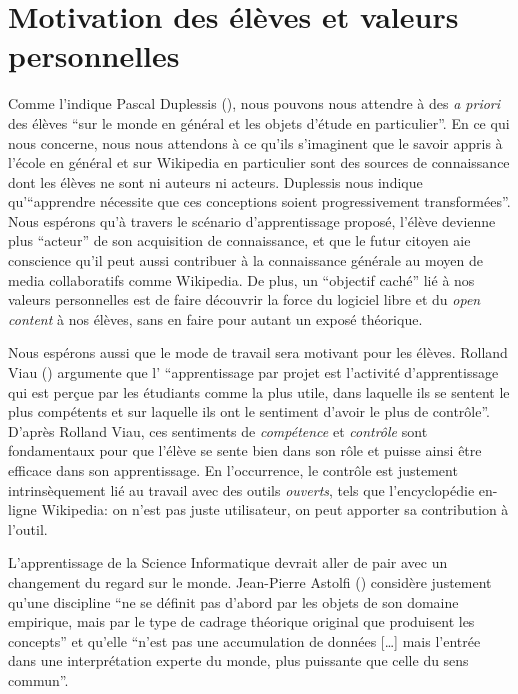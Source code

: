 \documentclass[11pt,bibliography=totoc]{scrartcl}
\begin{document}
\section{Motivation des élèves et valeurs personnelles}
Comme l'indique Pascal Duplessis (\cite{duplessis}), nous pouvons nous attendre
à des \textit{a priori} des élèves ``sur le monde en général et les objets
d'étude en particulier''. En ce qui nous concerne, nous nous attendons à ce
qu'ils s'imaginent que le savoir appris à l'école en général et sur Wikipedia en
particulier sont des sources de connaissance dont les élèves ne sont ni auteurs
ni acteurs. Duplessis nous indique qu'``apprendre nécessite que ces conceptions
soient progressivement transformées''. Nous espérons qu'à travers le scénario
d'apprentissage proposé, l'élève devienne plus ``acteur'' de son acquisition de
connaissance, et que le futur citoyen aie conscience qu'il peut aussi contribuer
à la connaissance générale au moyen de media collaboratifs comme Wikipedia.  De
plus, un ``objectif caché'' lié à nos valeurs personnelles est de faire
découvrir la force du logiciel libre et du \textit{open content} à nos élèves,
sans en faire pour autant un exposé théorique.
 
Nous espérons aussi que le mode de travail sera motivant pour les
élèves. Rolland Viau (\cite{viau}) argumente que l' ``apprentissage par projet
est l'activité d'apprentissage qui est perçue par les étudiants comme la plus
utile, dans laquelle ils se sentent le plus compétents et sur laquelle ils ont
le sentiment d'avoir le plus de contrôle''. D'après Rolland Viau, ces sentiments
de \textit{compétence} et \textit{contrôle} sont fondamentaux pour que l'élève
se sente bien dans son rôle et puisse ainsi être efficace dans son
apprentissage.  En l'occurrence, le contrôle est justement intrinsèquement lié
au travail avec des outils \textit{ouverts}, tels que l'encyclopédie en-ligne
Wikipedia: on n'est pas juste utilisateur, on peut apporter sa contribution à
l'outil.

L'apprentissage de la Science Informatique devrait aller de pair avec un
changement du regard sur le monde. Jean-Pierre Astolfi (\cite{astolfi})
considère justement qu'une discipline ``ne se définit pas d'abord par les objets
de son domaine empirique, mais par le type de cadrage théorique original que
produisent les concepts'' et qu'elle ``n'est pas une accumulation de données
[\ldots] mais l'entrée dans une interprétation experte du monde, plus puissante
que celle du sens commun''.
\end{document}
